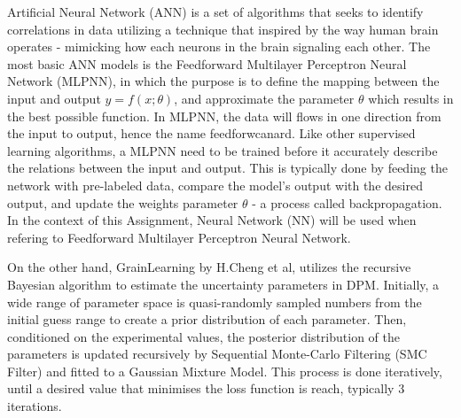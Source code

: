 \documentclass[../BachelorAssignment.tex]{subfiles}
\begin{document}
Artificial Neural Network (ANN) is a set of algorithms that seeks to identify correlations in data utilizing a technique that inspired by the way human brain operates - mimicking how each neurons in the brain signaling each other. The most basic ANN models is the Feedforward Multilayer Perceptron Neural Network (MLPNN), in which the purpose is to define the mapping between the input and output \(y = f(x;\theta)\), and approximate the parameter \(\theta\) which results in the best possible function. In MLPNN, the data will flows in one direction from the input to output, hence the name feedforwcanard. Like other supervised learning algorithms, a MLPNN need to be trained before it  accurately describe the relations between the input and output. This is typically done by feeding the network with pre-labeled data, compare the model's output with the desired output, and update the weights parameter \(\theta\) - a process called backpropagation. In the context of this Assignment, Neural Network (NN) will be used when refering to Feedforward Multilayer Perceptron Neural Network. 

On the other hand, GrainLearning by H.Cheng et al, utilizes the recursive Bayesian algorithm to estimate the uncertainty parameters in DPM. Initially, a wide range of parameter space is quasi-randomly sampled numbers from the initial guess range to create a prior distribution of each parameter. Then, conditioned on the experimental values, the posterior distribution of the parameters is updated recursively by Sequential Monte-Carlo Filtering (SMC Filter) and fitted to a Gaussian Mixture Model. This process is done iteratively, until a desired value that minimises the loss function is reach, typically 3 iterations. 

\end{document}
